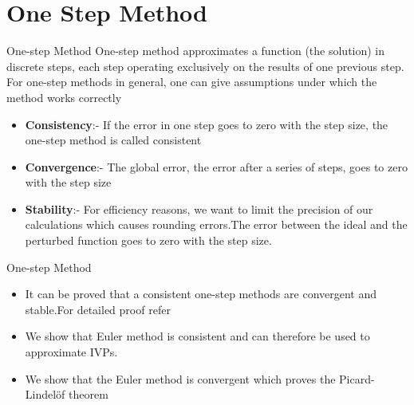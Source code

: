\documentclass{beamer}
\begin{document}
\section{One Step Method}

\begin{frame}{One-step Method}{}
One-step method approximates a function (the solution)
in discrete steps, each step operating exclusively on the results of one previous
step. For one-step methods in general, one can give assumptions under which
the method works correctly \cite{ODE}
\begin{itemize}
      \item \textbf{Consistency}:- If the error in one step
goes to zero with the step size, the one-step method is called consistent\\
    \item \textbf{Convergence}:- The global error, the error after a series of steps, goes to zero with the step size\\
    \item \textbf{Stability}:- For efficiency reasons, we want to limit the precision of our calculations which causes rounding errors.The error between the
ideal and the perturbed function goes to zero with the step size.\\
  \end{itemize}

\end{frame}


\begin{frame}{One-step Method}
\begin{itemize}
\item It can be proved that a consistent one-step methods are convergent and stable.For detailed proof refer \cite{ODE}
\item We show that Euler method is consistent and can therefore be used to approximate IVPs.
\item We show that the Euler method is convergent which proves the Picard-Lindel\"of theorem
\end{itemize}
\end{frame}
\end{document}
